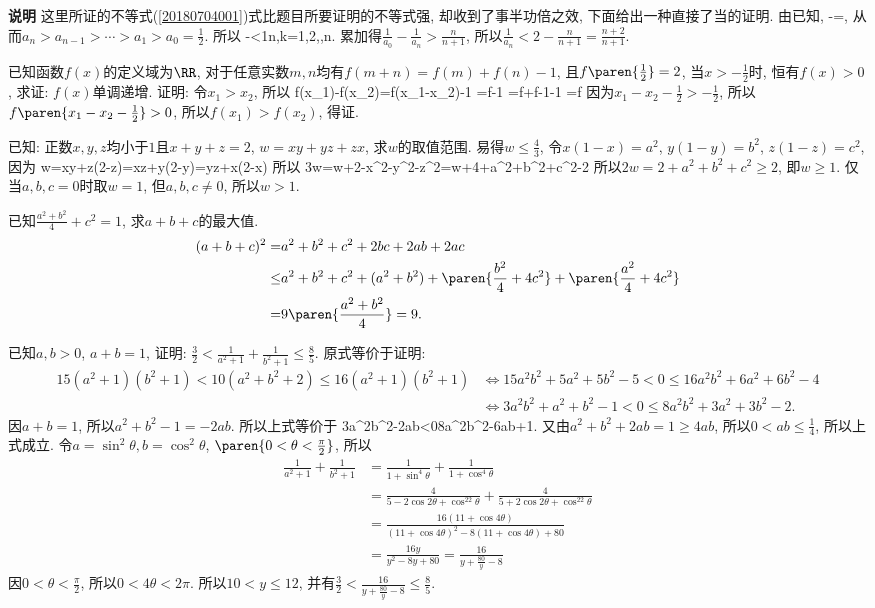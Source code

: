{\bf{说明}} 这里所证的不等式(\ref{20180704001})式比题目所要证明的不等式强, 却收到了事半功倍之效,
下面给出一种直接了当的证明.
\ea
\ba
由已知, 
\bee
{}-=,
\eee
从而$a_n>a_{n-1}>\cdots>a_1>a_0=\frac12$. 所以
\bee
{}-<\frac1n,\quad k=1,2,\cdots,n.
\eee
累加得$\frac1{a_0}-\frac1{a_n}>\frac{n}{n+1}$, 所以$\frac{1}{a_n}<2-\frac{n}{n+1}=\frac{n+2}{n+1}$.
\ea

\bq{}{}
已知函数$f(x)$的定义域为$\RR$, 对于任意实数$m,n$均有$f(m+n)=f(m)+f(n)-1$, 且$f\paren{\frac12}=2$, 
当$x>-\frac12$时, 恒有$f(x)>0$, 求证: $f(x)$单调递增.
\eq
\ba
证明: 令$x_1>x_2$, 所以
\bee
f(x_1)-f(x_2)=f(x_1-x_2)-1
  =f-1
  =f+f-1-1
  =f
\eee
因为$x_1-x_2-\frac12>-\frac12$, 所以$f\paren{x_1-x_2-\frac12}>0$, 
所以$f(x_1)>f(x_2)$, 得证.
\ea

\bq{}{}
已知: 正数$x,y,z$均小于$1$且$x+y+z=2$, $w=xy+yz+zx$, 求$w$的取值范围.
\eq
\ba
易得$w\le\frac43$, 令$x(1-x)=a^2$, $y(1-y)=b^2$, $z(1-z)=c^2$, 因为
\bee
w=xy+z(2-z)=xz+y(2-y)=yz+x(2-x)
\eee
所以
\bee
3w=w+2-x^2-y^2-z^2=w+4+a^2+b^2+c^2-2
\eee
所以$2w=2+a^2+b^2+c^2\ge2$, 即$w\ge1$.
仅当$a,b,c=0$时取$w=1$, 但$a,b,c\ne0$, 所以$w>1$.
\ea

\bq{}{}
已知$\frac{a^2+b^2}{4}+c^2=1$, 求$a+b+c$的最大值.
\eq
\ba
\begin{align*}
 (a+b+c)^2 = & a^2+b^2+c^2+2bc+2ab+2ac\\
  \le & a^2+b^2+c^2+(a^2+b^2)+\paren{\frac{b^2}{4}+4c^2}+\paren{\frac{a^2}{4}+4c^2}\\
  = & 9\paren{\frac{a^2+b^2}{4}}=9.
\end{align*}
\ea

\bq{}{}
已知$a,b>0$, $a+b=1$, 证明: $\frac32<\frac1{a^2+1}+\frac1{b^2+1}\le\frac85$.
\eq
\ba
原式等价于证明:
\begin{align*}
 15(a^2+1)(b^2+1)<10(a^2+b^2+2)\le16(a^2+1)(b^2+1)
  & \Longleftrightarrow 15a^2b^2+5a^2+5b^2-5<0\le16a^2b^2+6a^2+6b^2-4\\
  & \Longleftrightarrow 3a^2b^2+a^2+b^2-1<0\le8a^2b^2+3a^2+3b^2-2.
\end{align*}
因$a+b=1$, 所以$a^2+b^2-1=-2ab$. 所以上式等价于
\bee
3a^2b^2-2ab<0\le8a^2b^2-6ab+1.
\eee
又由$a^2+b^2+2ab=1\ge4ab$, 所以$0<ab\le\frac14$, 所以上式成立.
\ea
\ba
令$a=\sin^2\theta, b=\cos^2\theta$, $\paren{0<\theta<\frac{\pi}{2}}$, 所以
\begin{align*}
\frac1{a^2+1}+\frac1{b^2+1}
  &=\frac1{1+\sin^4\theta}+\frac1{1+\cos^4\theta}\\
  &=\frac4{5-2\cos2\theta+\cos^22\theta}+\frac4{5+2\cos2\theta+\cos^22\theta}\\
  &=\frac{16(11+\cos4\theta)}{(11+\cos4\theta)^2-8(11+\cos4\theta)+80}\\
  &=\frac{16y}{y^2-8y+80}=\frac{16}{y+\frac{80}{y}-8}
\end{align*}
因$0<\theta<\frac{\pi}{2}$, 所以$0<4\theta<2\pi$. 所以$10<y\le12$, 并有$\frac32<\frac{16}{y+\frac{80}{y}-8}\le\frac85$.
\ea

